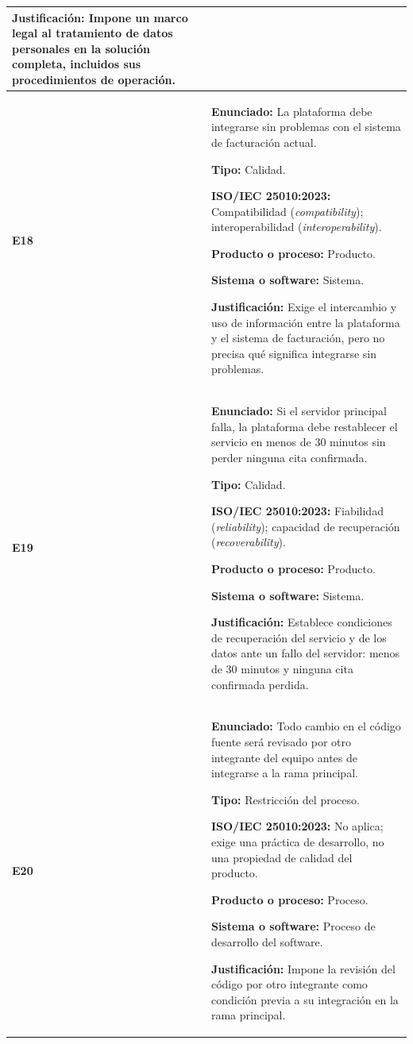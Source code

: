 \documentclass[11pt,a4paper]{article}
\begin{document}
\begin{longtable}{|
    p{}|
    p{}|}
\textbf{Justificación:}
Impone un marco legal al tratamiento de
datos personales en la solución completa,
incluidos sus procedimientos de operación.
\\
\hline

\textbf{E18} &
\textbf{Enunciado:}
La plataforma debe integrarse sin problemas
con el sistema de facturación actual.

\textbf{Tipo:} Calidad.

\textbf{ISO/IEC 25010:2023:}
Compatibilidad (\textit{compatibility});
interoperabilidad (\textit{interoperability}).

\textbf{Producto o proceso:} Producto.

\textbf{Sistema o software:} Sistema.

\textbf{Justificación:}
Exige el intercambio y uso de información
entre la plataforma y el sistema de facturación,
pero no precisa qué significa integrarse
sin problemas.
\\
\hline

\textbf{E19} &
\textbf{Enunciado:}
Si el servidor principal falla, la plataforma
debe restablecer el servicio en menos de
30 minutos sin perder ninguna cita confirmada.

\textbf{Tipo:} Calidad.

\textbf{ISO/IEC 25010:2023:}
Fiabilidad (\textit{reliability});
capacidad de recuperación
(\textit{recoverability}).

\textbf{Producto o proceso:} Producto.

\textbf{Sistema o software:} Sistema.

\textbf{Justificación:}
Establece condiciones de recuperación del
servicio y de los datos ante un fallo del
servidor: menos de 30 minutos y ninguna
cita confirmada perdida.
\\
\hline

\textbf{E20} &
\textbf{Enunciado:}
Todo cambio en el código fuente será revisado
por otro integrante del equipo antes de
integrarse a la rama principal.

\textbf{Tipo:} Restricción del proceso.

\textbf{ISO/IEC 25010:2023:}
No aplica; exige una práctica de desarrollo,
no una propiedad de calidad del producto.

\textbf{Producto o proceso:} Proceso.

\textbf{Sistema o software:}
Proceso de desarrollo del software.

\textbf{Justificación:}
Impone la revisión del código por otro
integrante como condición previa a su
integración en la rama principal.
\\
\hline
\end{longtable}
\end{document}
